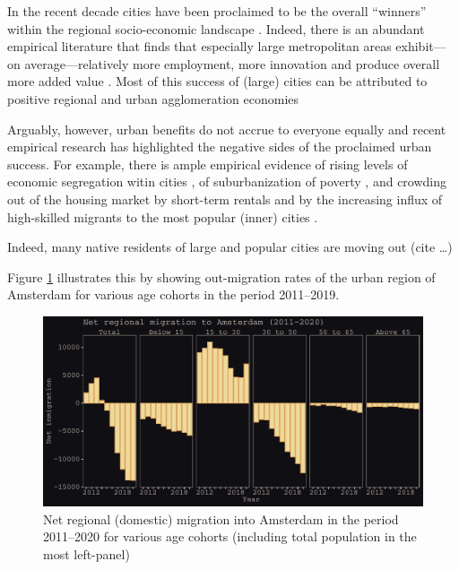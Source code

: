 \documentclass[11pt,parskip,abstracton,notitlepage, dvipsnames]{scrartcl}
\begin{document}
In the recent decade cities have been proclaimed to be the overall ``winners''
within the regional socio-economic landscape \citep[]{glaeser2012triumph}.
Indeed, there is an abundant empirical literature that finds that especially
large metropolitan areas exhibit---on average---relatively more employment, more
innovation and produce overall more added value \citep[see,
e.g.,][]{balland2020complex}. Most of this success of (large) cities can be
attributed to positive regional and urban agglomeration economies \citep[see for
recent overviews of the size, scope and nature of these urban
economies][]{melo2009meta, duranton2020, rosenthal2020}

Arguably, however, urban benefits do not accrue to everyone equally and recent
empirical research has highlighted the negative sides of the proclaimed urban
success. For example, there is ample empirical evidence of rising levels of
economic segregation witin cities \citep{tammaru2015socio}, of suburbanization
of poverty \citep{hochstenbach2018gentrification}, and crowding out of the
housing market by short-term rentals \citep{koster2018short} and by the
increasing influx of high-skilled migrants to the most popular (inner) cities
\citep{beckers2019residential}.

Indeed, many native residents of large and popular cities are moving out (cite \dots)

Figure \ref{fig:adam_mig} illustrates this by showing out-migration rates of the
urban region of Amsterdam for
various age cohorts in the period 2011--2019. 

\begin{figure}[h!]\centering %
 \includegraphics[width=1\linewidth]{../../fig/outmig_amsterdam.pdf}
 \caption{Net regional (domestic) migration into Amsterdam in the period 2011--2020 for
   various age cohorts (including total population in the most left-panel)}
  \label{fig:adam_mig}
\end{figure}
\end{document}
